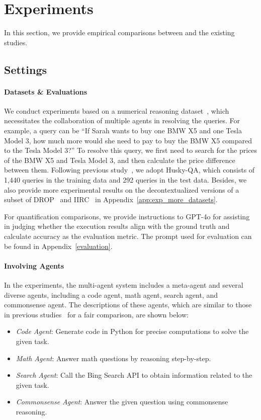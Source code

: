 \section{Experiments}
\label{sec:exp}
In this section, we provide empirical comparisons between \name and the existing studies.

\subsection{Settings}
\label{subsec:exp_settings}
\paragraph{Datasets \& Evaluations} 
We conduct experiments based on a numerical reasoning dataset~\citep{kim2024husky}, which necessitates the collaboration of multiple agents in resolving the queries. For example, a query can be ``If Sarah wants to buy one BMW X5 and one Tesla Model 3, how much more would she need to pay to buy the BMW X5 compared to the Tesla Model 3?'' To resolve this query, we first need to search for the prices of the BMW X5 and Tesla Model 3, and then calculate the price difference between them.
Following previous study~\citep{kim2024husky}, we adopt Husky-QA, which consists of 1,440 queries in the training data and 292 queries in the test data. Besides, we also provide more experimental results on the decontextualized versions of a subset of DROP~\citep{DROP} and IIRC~\citep{IIRC} in Appendix~\ref{app:exp_more_datasets}.

For quantification comparisons, we provide instructions to GPT-4o \citep{openai20244o} for assisting in judging whether the execution results align with the ground truth and calculate accuracy as the evaluation metric. The prompt used for evaluation can be found in Appendix~\ref{evaluation}. 


\paragraph{Involving Agents}  
In the experiments, the multi-agent system includes a meta-agent and several diverse agents, including a code agent, math agent, search agent, and commonsense agent. The descriptions of these agents, which are similar to those in previous studies~\citep{kim2024husky} for a fair comparison, are shown below: 
\begin{itemize}
\item \textit{Code Agent}: Generate code in Python for precise computations to solve the given task.
\item \textit{Math Agent}: Answer math questions by reasoning step-by-step.
\item \textit{Search Agent}: Call the Bing Search API to obtain information related to the given task.
\item \textit{Commonsense Agent}: Answer the given question using commonsense reasoning.
\end{itemize}

